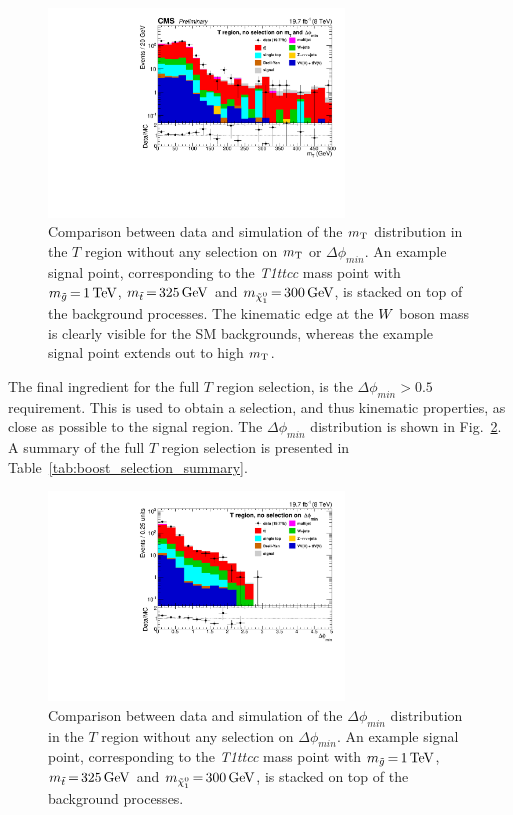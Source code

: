 \begin{figure}[htbp]
\centering
\includegraphics[width=0.7\textwidth]{figures/razor_selection/DataMC_mT_g1Mbg1W1Ll_rebin}
\caption{Comparison between data and simulation of the $m_{\mathrm{T}}$ distribution in the $T$ region without
any selection on $m_{\mathrm{T}}$ or $\Delta\phi_{min}$. An example signal
point, corresponding to the {\it T1ttcc} mass point with $m_{\tilde{g}} \,{=}\, 1\,\text{Te\hspace{-.08em}V}$,
$m_{\tilde{t}} \,{=}\, 325\,\text{Ge\hspace{-.08em}V}$ and $m_{\tilde{\chi}_1^0} \,{=}\, 300\,\text{Ge\hspace{-.08em}V}$, is stacked on top of
the
background processes. The kinematic edge at the $W$ boson mass is clearly
visible for the SM backgrounds, whereas the example signal point extends out to high $m_{\mathrm{T}}$.
\label{fig:boost_T_region_mT}}
\end{figure}

The final ingredient for the full $T$ region selection, is the $\Delta\phi_{min} > 0.5$
requirement. This is used to obtain a selection, and thus kinematic properties, as close as
possible to the signal region. The $\Delta\phi_{min}$ distribution is shown in
Fig.~\ref{fig:boost_T_region_mindeltaphi}. A summary of the full $T$ region selection is presented
in Table~\ref{tab:boost_selection_summary}. 


\begin{figure}[htbp]
\centering
\includegraphics[width=0.7\textwidth]
{figures/razor_selection/plots/DataMC_minDeltaPhi_g1Mbg1W1LlmT100_rebin}
\caption{Comparison between data and simulation of the $\Delta\phi_{min}$ distribution in the $T$
region without any selection on $\Delta\phi_{min}$. An example signal
point, corresponding to the {\it T1ttcc} mass point with $m_{\tilde{g}} \,{=}\, 1\,\text{Te\hspace{-.08em}V}$,
$m_{\tilde{t}} \,{=}\, 325\,\text{Ge\hspace{-.08em}V}$ and $m_{\tilde{\chi}_1^0} \,{=}\, 300\,\text{Ge\hspace{-.08em}V}$, is stacked on top of
the
background processes.
\label{fig:boost_T_region_mindeltaphi}}
\end{figure}


